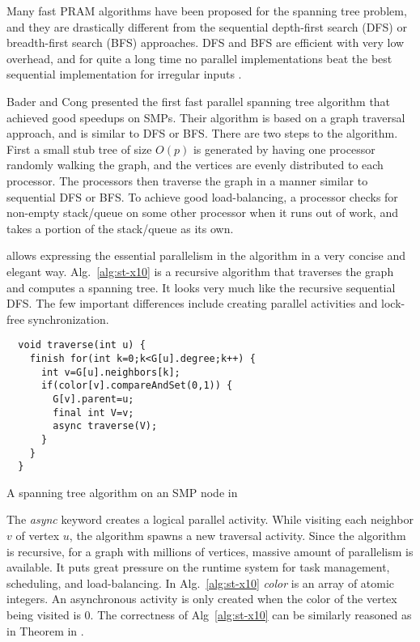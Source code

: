 Many fast PRAM algorithms have been proposed for the spanning tree problem, and they 
are drastically different from the sequential depth-first search (DFS) or breadth-first search (BFS) approaches.
DFS and BFS are efficient with very low overhead, and for quite a long time no parallel implementations beat the
best sequential implementation for irregular inputs \cite{BC04a}. 

Bader and Cong \cite{BC04a} presented the first fast parallel spanning tree algorithm that achieved good 
speedups on SMPs. Their algorithm is based on a graph traversal approach, and is similar to DFS or BFS. 
There are two steps to the algorithm. First a small stub tree of size $O(p)$ is generated by having one processor randomly walking the graph, and the vertices are evenly distributed to each processor.
The processors then traverse the graph in a manner similar to sequential DFS or BFS. 
To achieve good load-balancing, a processor checks for non-empty stack/queue on some other processor when it runs out of work, and takes a portion of the stack/queue as its own.

\Xten{} allows expressing the essential parallelism in the algorithm in a very concise and elegant way. Alg.~\ref{alg:st-x10} is a recursive algorithm that traverses the graph and computes a spanning tree. It looks very much like the recursive sequential DFS. The few important differences include creating parallel activities and lock-free synchronization.  
\begin{algorithm}
\centering
\scriptsize
\begin{minipage}{0.5\textwidth}
\begin{verbatim} 
  void traverse(int u) {
    finish for(int k=0;k<G[u].degree;k++) {
      int v=G[u].neighbors[k];
      if(color[v].compareAndSet(0,1)) {
        G[v].parent=u;
        final int V=v;
        async traverse(V);
      }
    }
  }
\end{verbatim}
\end{minipage}
\caption{A spanning tree algorithm on an SMP node in \Xten{}}
\label{alg:st-x10}
\end{algorithm}

The \emph{async} keyword creates a logical parallel activity. While visiting each neighbor $v$ of vertex $u$, the algorithm spawns a new traversal activity. Since the algorithm is recursive, for a graph with millions of vertices, massive amount of parallelism is available. It puts great pressure on the runtime system for task management, scheduling, and load-balancing. In Alg.~\ref{alg:st-x10} \emph{color} is an array of atomic integers. An asynchronous activity is only created when the color of the vertex being visited is 0. The correctness of Alg~\ref{alg:st-x10} can be similarly reasoned as in Theorem in \cite{BC04a}. 

